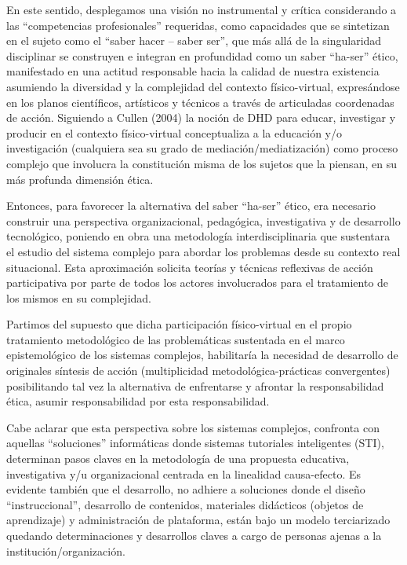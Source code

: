 En este sentido, desplegamos una visión no instrumental y crítica considerando 
a las   “competencias  profesionales”   requeridas, como capacidades que se
sintetizan en el sujeto como el “saber hacer – saber ser”, que más allá
de la singularidad disciplinar se construyen e integran en profundidad como un
saber “ha-ser” ético, manifestado en una actitud responsable hacia la calidad de
nuestra existencia asumiendo la diversidad y la complejidad del contexto
físico-virtual, expresándose en los planos científicos, artísticos y técnicos a
través de articuladas coordenadas de acción. Siguiendo a Cullen (2004) la noción
de DHD para educar, investigar y producir en el contexto físico-virtual
conceptualiza a la educación  y/o   investigación  (cualquiera     sea   su    
grado de mediación/mediatización) como proceso   complejo que  involucra   la
constitución misma de los sujetos que la piensan, en su más profunda dimensión
ética.

Entonces, para favorecer la alternativa del saber “ha-ser” ético, era necesario
construir una perspectiva   organizacional, pedagógica, investigativa y
de desarrollo tecnológico, poniendo en obra una metodología interdisciplinaria
que sustentara el estudio del sistema complejo para abordar los problemas desde
su contexto real situacional. Esta aproximación solicita teorías y técnicas
reflexivas de acción participativa por parte de todos los actores involucrados
para el tratamiento de los mismos en su complejidad.

Partimos del supuesto que dicha participación físico-virtual en el propio
tratamiento metodológico de las problemáticas sustentada en el marco
epistemológico de los sistemas complejos, habilitaría la necesidad de desarrollo
de originales síntesis de acción (multiplicidad metodológica-prácticas
convergentes) posibilitando tal vez la alternativa de enfrentarse y afrontar la
responsabilidad ética, asumir responsabilidad por esta responsabilidad.

Cabe aclarar que esta perspectiva sobre los sistemas complejos, confronta con
aquellas “soluciones” informáticas donde sistemas tutoriales inteligentes (STI),
determinan pasos claves en la metodología de una propuesta educativa,
investigativa y/u organizacional centrada en la linealidad
causa-efecto. Es evidente también que el desarrollo, no  adhiere  a  soluciones
 donde   el  diseño “instruccional”, desarrollo de contenidos, materiales
didácticos (objetos de aprendizaje) y administración de plataforma, están bajo
un modelo terciarizado quedando determinaciones y desarrollos claves a cargo de
personas ajenas a la institución/organización.

